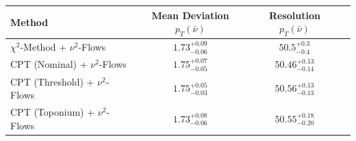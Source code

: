     \begin{tabular}{lccc}
        \toprule
        Method & Mean Deviation $p_{T}(\bar{\nu})$ & Resolution $p_{T}(\bar{\nu})$ \\
        \midrule
        $\chi^2$-Method + $\nu^2$-Flows & $1.73^{+0.09}_{-0.06}$ & $50.5^{+0.3}_{-0.4}$ \\
        CPT (Nominal) + $\nu^2$-Flows & $1.75^{+0.07}_{-0.05}$ & $50.46^{+0.13}_{-0.14}$ \\
        CPT (Threshold) + $\nu^2$-Flows & $1.75^{+0.05}_{-0.03}$ & $50.56^{+0.13}_{-0.13}$ \\
        CPT (Toponium) + $\nu^2$-Flows & $1.73^{+0.08}_{-0.06}$ & $50.55^{+0.18}_{-0.20}$ \\
        \bottomrule
    \end{tabular}